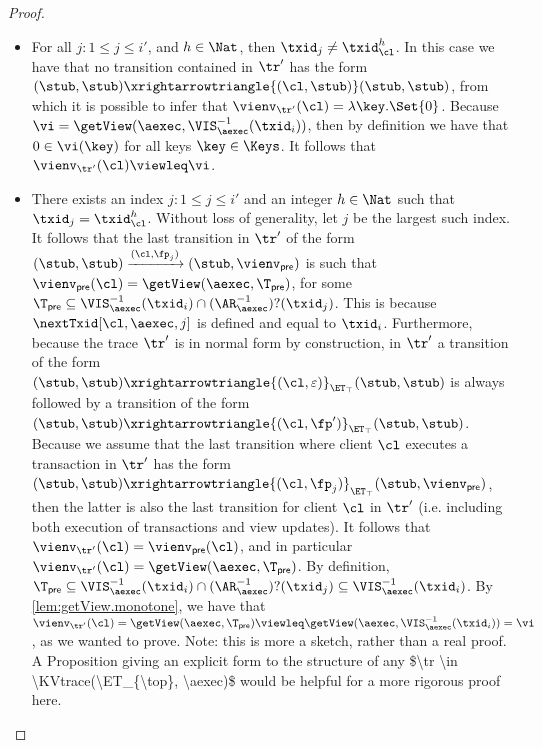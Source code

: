 \begin{proof}
\begin{itemize}
\begin{enumerate}
\begin{itemize}
\item For all $j : 1 \leq j \leq i'$, and $h \in \Nat$, then $\txid_{j} \neq \txid_{\cl}^{h}$.
In this case we have that no transition contained in $\tr'$ has the form 
$(\stub, \stub) \xrightarrowtriangle{(\cl, \stub)} (\stub, \stub)$, from which it is possible to infer 
that  $\vienv_{\tr'}(\cl) = \lambda \key. \Set{0}$. Because $\vi = \getView(\aexec, \VIS^{-1}_{\aexec}(\txid_{i}))$, 
then by definition we have that $0 \in \vi(\key)$ for all keys $\key \in \Keys$. It follows that 
$\vienv_{\tr'}(\cl) \viewleq \vi$. 

\item There exists an index $j : 1 \leq j \leq i'$ and an integer $h \in \Nat$ such that $\txid_{j} = \txid_{\cl}^{h}$. 
Without loss of generality, let $j$ be the largest such index. 
It follows that the last transition in $\tr'$ of the form $(\stub, \stub) \xrightarrow{(\cl, \fp_{j})} (\stub, \vienv_{\mathsf{pre}})$ 
is such that $\vienv_{\mathsf{pre}}(\cl) = \getView(\aexec, \T_{\mathsf{pre}})$, 
for some $\T_{\mathsf{pre}} \subseteq \VIS^{-1}_{\aexec}(\txid_{i}) \cap (\AR^{-1}_{\aexec})?(\txid_{j})$.
This is because $\nextTxid[\cl, \aexec, j]$  is defined and equal to $\txid_{i}$. 
Furthermore, because the trace $\tr'$ is in normal form by construction, 
in $\tr'$ a transition of the form $(\stub, \stub) \xrightarrowtriangle{(\cl, \varepsilon)}_{\ET_{\top}} (\stub, \stub)$ 
is always followed by a transition of the form $(\stub, \stub) \xrightarrowtriangle{(\cl, \fp')}_{\ET_{\top}} (\stub, \stub)$. 
Because we assume that the last transition where client $\cl$ executes a transaction in $\tr'$ 
has the form $(\stub, \stub) \xrightarrowtriangle{(\cl, \fp_{j})}_{\ET_{\top}} (\stub, \vienv_{\mathsf{pre}})$, 
then the latter is also the last transition for client $\cl$ in $\tr'$ 
(i.e. including both execution of transactions and view updates). 
It follows that $\vienv_{\tr'}(\cl) = \vienv_{\mathsf{pre}}(\cl)$, and in particular 
$\vienv_{\tr'}(\cl) = \getView(\aexec, \T_{\mathsf{pre}})$. By definition, 
$\T_{\mathsf{pre}} \subseteq  \VIS^{-1}_{\aexec}(\txid_{i}) \cap (\AR^{-1}_{\aexec})?(\txid_{j}) 
\subseteq \VIS^{-1}_{\aexec}(\txid_{i})$. By  \cref{lem:getView.monotone}, 
we have that $\vienv_{\tr'}(\cl) = \getView(\aexec, \T_{\mathsf{pre}}) \viewleq 
\getView(\aexec, \VIS^{-1}_{\aexec}(\txid_{i})) = \vi$, as we wanted to prove.
\ac{Note: this is more a sketch, rather than a real proof. A Proposition giving an explicit form to the 
structure of any $\tr \in \KVtrace(\ET_{\top}, \aexec)$ would be helpful for a more rigorous proof here.}
\end{itemize}



\end{enumerate}
\end{itemize}
\end{proof}

